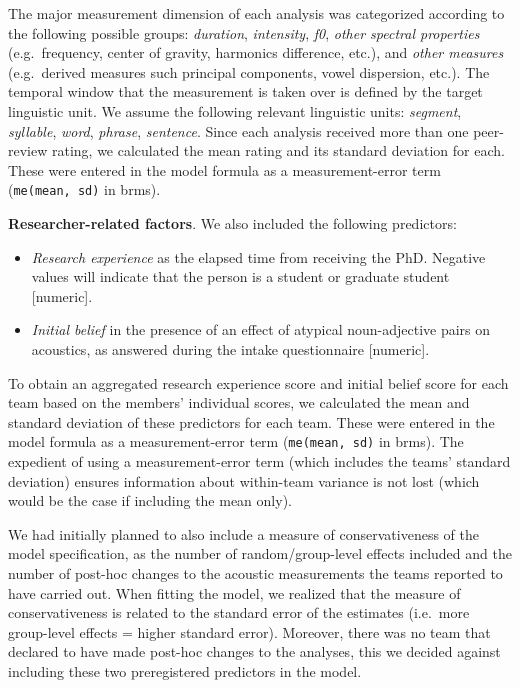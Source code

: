 \documentclass[Review,times,sageh]{sagej}
\providecommand{\tightlist}{\setlength{\itemsep}{0pt}\setlength{\parskip}{0pt}}
\begin{document}
The major measurement dimension of each analysis was categorized according to the following possible groups: \emph{duration}, \emph{intensity}, \emph{f0}, \emph{other spectral properties} (e.g.~frequency, center of gravity, harmonics difference, etc.), and \emph{other measures} (e.g.~derived measures such principal components, vowel dispersion, etc.).
The temporal window that the measurement is taken over is defined by the target linguistic unit.
We assume the following relevant linguistic units: \emph{segment}, \emph{syllable}, \emph{word}, \emph{phrase}, \emph{sentence}.
Since each analysis received more than one peer-review rating, we calculated the mean rating and its standard deviation for each.
These were entered in the model formula as a measurement-error term (\texttt{me(mean,\ sd)} in brms).

\textbf{Researcher-related factors}. We also included the following predictors:

\begin{itemize}
\tightlist
\item
  \emph{Research experience} as the elapsed time from receiving the PhD. Negative values will indicate that the person is a student or graduate student {[}numeric{]}.
\item
  \emph{Initial belief} in the presence of an effect of atypical noun-adjective pairs on acoustics, as answered during the intake questionnaire {[}numeric{]}.
\end{itemize}

To obtain an aggregated research experience score and initial belief score for each team based on the members' individual scores, we calculated the mean and standard deviation of these predictors for each team.
These were entered in the model formula as a measurement-error term (\texttt{me(mean,\ sd)} in brms).
The expedient of using a measurement-error term (which includes the teams' standard deviation) ensures information about within-team variance is not lost (which would be the case if including the mean only).

We had initially planned to also include a measure of conservativeness of the model specification, as the number of random/group-level effects included and the number of post-hoc changes to the acoustic measurements the teams reported to have carried out.
When fitting the model, we realized that the measure of conservativeness is related to the standard error of the estimates (i.e.~more group-level effects = higher standard error).
Moreover, there was no team that declared to have made post-hoc changes to the analyses, this we decided against including these two preregistered predictors in the model.
\end{document}
